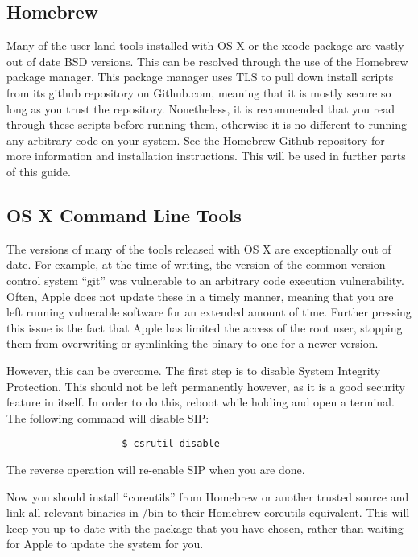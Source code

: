			\subsection{Homebrew}
				Many of the user land tools installed with OS X or the xcode package are vastly out of date BSD versions.
				This can be resolved through the use of the Homebrew package manager.
				This package manager uses TLS to pull down install scripts from its github repository on Github.com, meaning that it is mostly secure so long as you trust the repository.
				Nonetheless, it is recommended that you read through these scripts before running them, otherwise it is no different to running any arbitrary code on your system.
				See the \href{https://github.com/Homebrew/homebrew}{Homebrew Github repository} for more information and installation instructions.
				This will be used in further parts of this guide.
			\subsection{OS X Command Line Tools}
				The versions of many of the tools released with OS X are exceptionally out of date.
				For example, at the time of writing, the version of the common version control system ``git'' was vulnerable to an arbitrary code execution vulnerability.
				Often, Apple does not update these in a timely manner, meaning that you are left running vulnerable software for an extended amount of time.
				Further pressing this issue is the fact that Apple has limited the access of the root user, stopping them from overwriting or symlinking the binary to one for a newer version.

				However, this can be overcome.
				The first step is to disable System Integrity Protection. This should not be left permanently however, as it is a good security feature in itself.
				In order to do this, reboot while holding  and open a terminal. The following command will disable SIP:
				\begin{verbatim}
					$ csrutil disable
				\end{verbatim}
				The reverse operation will re-enable SIP when you are done.

				Now you should install ``coreutils'' from Homebrew or another trusted source and link all relevant binaries in /bin to their Homebrew coreutils equivalent.
				This will keep you up to date with the package that you have chosen, rather than waiting for Apple to update the system for you.
